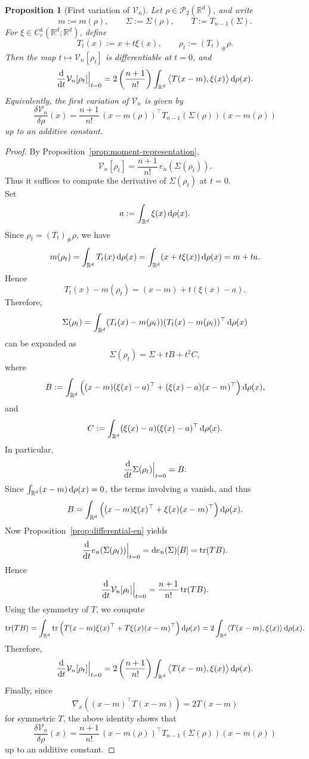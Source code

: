 \documentclass[11pt,reqno]{amsart}
\numberwithin{figure}{section}
\def\d {{\partial}}
\def\d{\mathrm{d}}
\renewcommand{\d}{  {\textup{d}} }
\newtheorem{proposition}{Proposition}[section]
\begin{document}
 
 
 
 



\begin{proposition}[First variation of $\mathcal V_n$]
	\label{prop:first-variation-Vn}
	Let $\rho\in\mathcal P_2(\mathbb R^d)$, and write
	\[
	m:=m(\rho),
	\qquad
	\Sigma:=\Sigma(\rho),
	\qquad
	T:=T_{n-1}(\Sigma).
	\]
	For $\xi\in C_c^1(\mathbb R^d;\mathbb R^d)$, define
	\[
	T_t(x):=x+t\xi(x),
	\qquad
	\rho_t:=(T_t)_\#\rho .
	\]
	Then the map $t\mapsto \mathcal V_n[\rho_t]$ is differentiable at $t=0$, and
	\[
	\frac{\d}{\d t}\mathcal V_n[\rho_t]\Big|_{t=0}
	=
	2\left(\frac{n+1}{n!}\right)
	\int_{\mathbb R^d}
	\big\langle T(x-m),\xi(x)\big\rangle\,\d\rho(x).
	\]
	Equivalently, the first variation of $\mathcal V_n$ is given by
	\[
	\frac{\delta\mathcal V_n}{\delta\rho}(x)
	=
	\frac{n+1}{n!}\,(x-m(\rho))^\top T_{n-1}(\Sigma(\rho))(x-m(\rho))
	\]
	up to an additive constant.
\end{proposition}



\begin{proof}
	By Proposition~\ref{prop:moment-representation},
	\[
	\mathcal V_n[\rho_t]
	=
	\frac{n+1}{n!}\,e_n(\Sigma(\rho_t)).
	\]
	Thus it suffices to compute the derivative of $\Sigma(\rho_t)$ at $t=0$.\\
	
	Set
	\[
	a:=\int_{\mathbb R^d}\xi(x)\,\d\rho(x).
	\]
	Since $\rho_t=(T_t)_\#\rho$, we have
	\[
	m(\rho_t)
	=
	\int_{\mathbb R^d}T_t(x)\,\d\rho(x)
	=
	\int_{\mathbb R^d}(x+t\xi(x))\,\d\rho(x)
	=
	m+t a.
	\]
	Hence
	\[
	T_t(x)-m(\rho_t)
	=
	(x-m)+t(\xi(x)-a).
	\]
	Therefore,
	\[
	\Sigma(\rho_t)
	=
	\int_{\mathbb R^d}
	(T_t(x)-m(\rho_t))(T_t(x)-m(\rho_t))^\top\,\d\rho(x)
	\]
	can be expanded as
	\[
	\Sigma(\rho_t)
	=
	\Sigma+tB+t^2C,
	\]
	where
	\[
	B
	:=
	\int_{\mathbb R^d}
	\Big((x-m)(\xi(x)-a)^\top+(\xi(x)-a)(x-m)^\top\Big)\,\d\rho(x),
	\]
	and
	\[
	C
	:=
	\int_{\mathbb R^d}
	(\xi(x)-a)(\xi(x)-a)^\top\,\d\rho(x).
	\]
	In particular,
	\[
	\frac{\d}{\d t}\Sigma(\rho_t)\Big|_{t=0}=B.
	\]
	Since $\int_{\mathbb R^d}(x-m)\,\d\rho(x)=0$, the terms involving $a$ vanish, and thus
	\[
	B
	=
	\int_{\mathbb R^d}
	\Big((x-m)\xi(x)^\top+\xi(x)(x-m)^\top\Big)\,\d\rho(x).
	\]
	Now Proposition~\ref{prop:differential-en} yields
	\[
	\frac{\d}{\d t}e_n(\Sigma(\rho_t))\Big|_{t=0}
	=
	\d e_n(\Sigma)[B]
	=
	\operatorname{tr}(TB).
	\]
	Hence
	\[
	\frac{\d}{\d t}\mathcal V_n[\rho_t]\Big|_{t=0}
	=
	\frac{n+1}{n!}\operatorname{tr}(TB).
	\]
	Using the symmetry of $T$, we compute
	\[
	\operatorname{tr}(TB)
	=
	\int_{\mathbb R^d}
	\operatorname{tr}\Big(T(x-m)\xi(x)^\top+T\xi(x)(x-m)^\top\Big)\,\d\rho(x)
	=
	2\int_{\mathbb R^d}\langle T(x-m),\xi(x)\rangle\,\d\rho(x).
	\]
	Therefore,
	\[
	\frac{\d}{\d t}\mathcal V_n[\rho_t]\Big|_{t=0}
	=
	2\left(\frac{n+1}{n!}\right)
	\int_{\mathbb R^d}
	\big\langle T(x-m),\xi(x)\big\rangle\,\d\rho(x).
	\]
	Finally, since
	\[
	\nabla_x\!\left((x-m)^\top T(x-m)\right)=2T(x-m)
	\]
	for symmetric $T$, the above identity shows that
	\[
	\frac{\delta\mathcal V_n}{\delta\rho}(x)
	=
	\frac{n+1}{n!}\,(x-m(\rho))^\top T_{n-1}(\Sigma(\rho))(x-m(\rho))
	\]
	up to an additive constant.
\end{proof}
\end{document}
